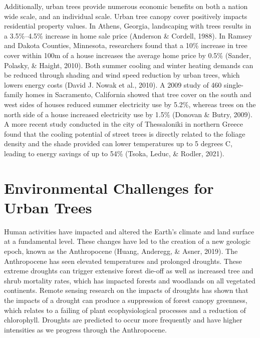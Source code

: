 \documentclass[12pt,twoside]{reedthesis}
\begin{document}
Additionally, urban trees provide numerous economic benefits on both a nation wide scale, and an individual scale. Urban tree canopy cover positively impacts residential property values. In Athens, Georgia, landscaping with trees results in a 3.5\%--4.5\% increase in home sale price (Anderson \& Cordell, 1988). In Ramsey and Dakota Counties, Minnesota, researchers found that a 10\% increase in tree cover within 100m of a house increases the average home price by 0.5\% (Sander, Polasky, \& Haight, 2010). Both summer cooling and winter heating demands can be reduced through shading and wind speed reduction by urban trees, which lowers energy costs (David J. Nowak et al., 2010). A 2009 study of 460 single-family homes in Sacramento, California showed that tree cover on the south and west sides of houses reduced summer electricity use by 5.2\%, whereas trees on the north side of a house increased electricity use by 1.5\% (Donovan \& Butry, 2009). A more recent study conducted in the city of Thessaloniki in northern Greece found that the cooling potential of street trees is directly related to the foliage density and the shade provided can lower temperatures up to 5 degrees C, leading to energy savings of up to 54\% (Tsoka, Leduc, \& Rodler, 2021).

\hypertarget{environmental-challenges-for-urban-trees}{%
\section{Environmental Challenges for Urban Trees}\label{environmental-challenges-for-urban-trees}}

Human activities have impacted and altered the Earth's climate and land surface at a fundamental level. These changes have led to the creation of a new geologic epoch, known as the Anthropocene (Huang, Anderegg, \& Asner, 2019). The Anthropocene has seen elevated temperatures and prolonged droughts. These extreme droughts can trigger extensive forest die-off as well as increased tree and shrub mortality rates, which has impacted forests and woodlands on all vegetated continents. Remote sensing research on the impacts of droughts has shown that the impacts of a drought can produce a suppression of forest canopy greenness, which relates to a failing of plant ecophysiological processes and a reduction of chlorophyll. Droughts are predicted to occur more frequently and have higher intensities as we progress through the Anthropocene.
\end{document}
